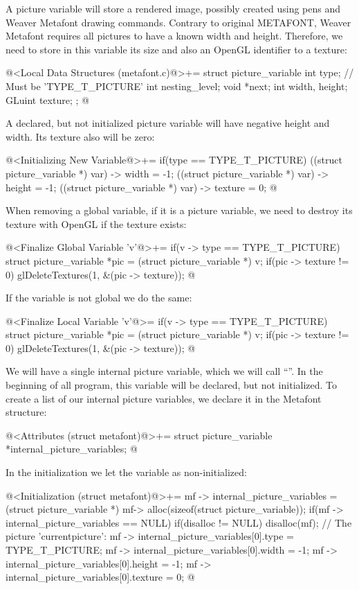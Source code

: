 
A picture variable will store a rendered image, possibly created using
pens and Weaver Metafont drawing commands. Contrary to original
METAFONT, Weaver Metafont requires all pictures to have a known width
and height. Therefore, we need to store in this variable its size and
also an OpenGL identifier to a texture:

\iniciocodigo
@<Local Data Structures (metafont.c)@>+=
struct picture_variable{
  int type; // Must be 'TYPE_T_PICTURE'
  int nesting_level;
  void *next;
  int width, height;
  GLuint texture;
};
@
\fimcodigo

A declared, but not initialized picture variable will have negative
height and width. Its texture also will be zero:

\iniciocodigo
@<Initializing New Variable@>+=
if(type == TYPE_T_PICTURE){
  ((struct picture_variable *) var) -> width = -1;
  ((struct picture_variable *) var) -> height = -1;
  ((struct picture_variable *) var) -> texture = 0;
}
@
\fimcodigo

When removing a global variable, if it is a picture variable, we need
to destroy its texture with OpenGL if the texture exists:

\iniciocodigo
@<Finalize Global Variable 'v'@>+=
if(v -> type == TYPE_T_PICTURE){
  struct picture_variable *pic = (struct picture_variable *) v;
  if(pic -> texture != 0)
    glDeleteTextures(1, &(pic -> texture));
}
@
\fimcodigo

If the variable is not global we do the same:

\iniciocodigo
@<Finalize Local Variable 'v'@>=
if(v -> type == TYPE_T_PICTURE){
  struct picture_variable *pic = (struct picture_variable *) v;
  if(pic -> texture != 0)
    glDeleteTextures(1, &(pic -> texture));
}
@
\fimcodigo

We will have a single internal picture variable, which we will call
``''. In the beginning of all program, this
variable will be declared, but not initialized. To create a list of
our internal picture variables, we declare it in the Metafont
structure:

\iniciocodigo
@<Attributes (struct metafont)@>+=
struct picture_variable *internal_picture_variables;
@
\fimcodigo

In the initialization we let the variable as non-initialized:

\iniciocodigo
@<Initialization (struct metafont)@>+=
mf -> internal_picture_variables = (struct picture_variable *)
                                   mf-> alloc(sizeof(struct picture_variable));
if(mf -> internal_picture_variables == NULL){
  if(disalloc != NULL)
    disalloc(mf);
}
// The picture 'currentpicture':
mf -> internal_picture_variables[0].type = TYPE_T_PICTURE;
mf -> internal_picture_variables[0].width = -1;
mf -> internal_picture_variables[0].height = -1;
mf -> internal_picture_variables[0].texture = 0;
@
\fimcodigo

